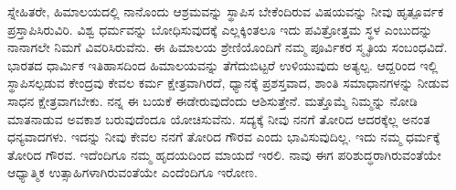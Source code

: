 \vskip 5pt

ಸ್ನೇಹಿತರೇ, ಹಿಮಾಲಯದಲ್ಲಿ ನಾನೊಂದು ಆಶ್ರಮವನ್ನು ಸ್ಥಾಪಿಸ ಬೇಕೆಂದಿರುವ ವಿಷಯವನ್ನು ನೀವು ಹೃತ್ಪೂರ್ವಕ ಪ್ರಸ್ತಾಪಿಸಿರುವಿರಿ. ವಿಶ್ವ ಧರ್ಮವನ್ನು ಬೋಧಿಸುವುದಕ್ಕೆ ಎಲ್ಲಕ್ಕಿಂತಲೂ ಇದು ಪವಿತ್ರೋತ್ತಮ ಸ್ಥಳ ಎಂಬುದನ್ನು ನಾನಾಗಲೇ ನಿಮಗೆ ವಿವರಿಸಿರುವೆನು. ಈ ಹಿಮಾಲಯ ಶ್ರೇಣಿಯೊಂದಿಗೆ ನಮ್ಮ ಪೂರ್ವಿಕರ ಸ್ಮೃತಿಯ ಸಂಬಂಧವಿದೆ. ಭಾರತದ ಧಾರ್ಮಿಕ ಇತಿಹಾಸದಿಂದ ಹಿಮಾಲಯವನ್ನು ತೆಗೆದುಬಿಟ್ಟರೆ ಉಳಿಯುವುದು ಅತ್ಯಲ್ಪ. ಆದ್ದರಿಂದ ಇಲ್ಲಿ ಸ್ಥಾಪಿಸಲ್ಪಡುವ ಕೇಂದ್ರವು ಕೇವಲ ಕರ್ಮ ಕ್ಷೇತ್ರವಾಗಿರದೆ, ಧ್ಯಾನಕ್ಕೆ ಪ್ರಶಸ್ತವಾದ, ಶಾಂತಿ ಸಮಾಧಾನಗಳನ್ನು ನೀಡುವ ಸಾಧನ ಕ್ಷೇತ್ರವಾಗಬೇಕು. ನನ್ನ ಈ ಬಯಕೆ ಈಡೇರುವುದೆಂದು ಆಶಿಸುತ್ತೇನೆ. ಮತ್ತೊಮ್ಮೆ ನಿಮ್ಮನ್ನು ನೋಡಿ ಮಾತನಾಡುವ ಅವಕಾಶ ಬರುವುದೆಂದೂ ಯೋಚಿಸುವೆನು. ಸದ್ಯಕ್ಕೆ ನೀವು ನನಗೆ ತೋರಿದ ಆದರಕ್ಕೆಲ್ಲ ಅನಂತ ಧನ್ಯವಾದಗಳು. ಇದನ್ನು ನೀವು ಕೇವಲ ನನಗೆ ತೋರಿದ ಗೌರವ ಎಂದು ಭಾವಿಸುವುದಿಲ್ಲ. ಇದು ನಮ್ಮ ಧರ್ಮಕ್ಕೆ ತೋರಿದ ಗೌರವ. ಇದೆಂದಿಗೂ ನಮ್ಮ ಹೃದಯದಿಂದ ಮಾಯದೆ ಇರಲಿ. ನಾವು ಈಗ ಪರಿಶುದ್ಧರಾಗಿರುವಂತೆಯೇ ಆಧ್ಯಾತ್ಮಿಕ ಉತ್ಸಾಹಿಗಳಾಗಿರುವಂತೆಯೇ ಎಂದೆಂದಿಗೂ ಇರೋಣ.

